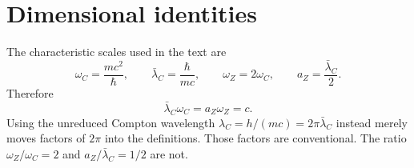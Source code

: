 \documentclass[11pt]{article}
\theoremstyle{definition}\newtheorem{definition}[theorem]{Definition}
\theoremstyle{remark}\newtheorem{remark}[theorem]{Remark}\newtheorem{conjecture}[theorem]{Conjecture}
\begin{document}
\section{Dimensional identities}\label{app:dim}
The characteristic scales used in the text are
\begin{equation}
 \omega_C=\frac{mc^2}{\hbar},\qquad
 \bar\lambda_C=\frac{\hbar}{mc},\qquad
 \omega_Z=2\omega_C,\qquad
 a_Z=\frac{\bar\lambda_C}{2}.
\end{equation}
Therefore
\begin{equation}
 \bar\lambda_C\omega_C=a_Z\omega_Z=c.
\end{equation}
Using the unreduced Compton wavelength $\lambda_C=h/(mc)=2\pi\bar\lambda_C$ instead merely moves factors of $2\pi$ into the definitions. Those factors are conventional. The ratio $\omega_Z/\omega_C=2$ and $a_Z/\bar\lambda_C=1/2$ are not.
\end{document}
